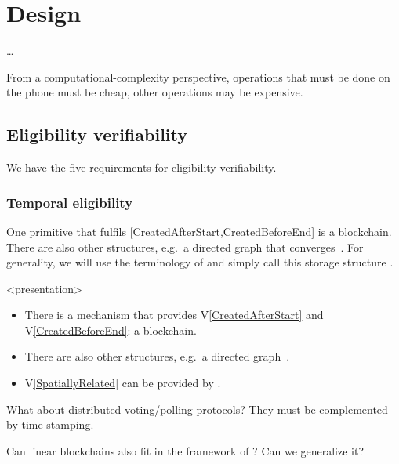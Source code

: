 \mode*

\section{Design}
\label{Design}

\dots

From a computational-complexity perspective, operations that must be done on 
the phone must be cheap, other operations may be expensive.

\subsection{Eligibility verifiability}

We have the five requirements for eligibility verifiability.

\subsubsection{Temporal eligibility}

One primitive that fulfils \cref{CreatedAfterStart,CreatedBeforeEnd} is a 
blockchain.
There are also other structures, e.g.\ a directed graph that 
converges~\cite{BlockchainFreeCryptocurrencies}.
For generality, we will use the terminology of 
\textcite{BlockchainFreeCryptocurrencies} and simply call this storage 
structure .

\begin{frame}<presentation>
\begin{idea}
  \begin{itemize}
    \item There is a mechanism that provides V\ref{CreatedAfterStart} and 
      V\ref{CreatedBeforeEnd}: a blockchain.

    \item There are also other structures, e.g.\ a directed 
      graph~\cite{BlockchainFreeCryptocurrencies}.

      \pause

    \item V\ref{SpatiallyRelated} can be provided by .
  \end{itemize}
\end{idea}
\end{frame}

\begin{frame}
  \begin{question}
    What about distributed voting/polling protocols?
    They must be complemented by time-stamping.
  \end{question}
  \begin{question}
    Can linear blockchains also fit in the framework of 
    \textcite{BlockchainFreeCryptocurrencies}?
    Can we generalize it?
  \end{question}
\end{frame}

